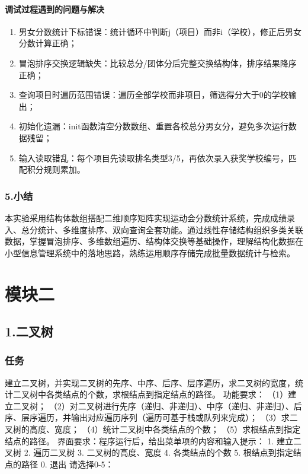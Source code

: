 \documentclass{ctexart}
\begin{document}
\paragraph{调试过程遇到的问题与解决}
\begin{enumerate}
\item 男女分数统计下标错误：统计循环中判断j（项目）而非i（学校），修正后男女分数计算正确；
\item 冒泡排序交换逻辑缺失：比较总分/团体分后完整交换结构体，排序结果降序正确；
\item 查询项目时遍历范围错误：遍历全部学校而非项目，筛选得分大于0的学校输出；
\item 初始化遗漏：init函数清空分数数组、重置各校总分男女分，避免多次运行数据残留；
\item 输入读取错乱：每个项目先读取排名类型3/5，再依次录入获奖学校编号，匹配积分规则累加。
\end{enumerate}

\subsubsection{5.小结}
本实验采用结构体数组搭配二维顺序矩阵实现运动会分数统计系统，完成成绩录入、总分统计、多维度排序、双向查询全套功能。通过线性存储结构组织多类关联数据，掌握冒泡排序、多维数组遍历、结构体交换等基础操作，理解结构化数据在小型信息管理系统中的落地思路，熟练运用顺序存储完成批量数据统计与检索。

\section{模块二}

\subsection{1.二叉树}
\subsubsection{任务}
建立二叉树，并实现二叉树的先序、中序、后序、层序遍历，求二叉树的宽度，统计二叉树中各类结点的个数，求根结点到指定结点的路径。
功能要求：
（1）建立二叉树；
（2）对二叉树进行先序（递归、非递归）、中序（递归、非递归）、后序、层序遍历，并输出对应遍历序列（遍历可基于栈或队列来完成）；
（3）求二叉树的高度、宽度；
（4）统计二叉树中各类结点的个数；
（5）求根结点到指定结点的路径。
界面要求：程序运行后，给出菜单项的内容和输入提示：
1. 建立二叉树
2. 遍历二叉树
3. 二叉树的高度、宽度
4. 各类结点的个数
5. 根结点到指定结点的路径
0. 退出
请选择0-5：
\end{document}
